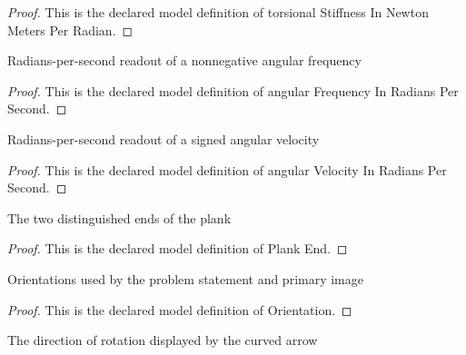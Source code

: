 \begin{proof}
  This is the declared model definition of torsional Stiffness In Newton Meters Per Radian.
\end{proof}
\begin{definition}
  \label{def:physics:phyx-mini-0232:phyxminiproblems-problemphyxmini0232-angularfrequencyinradianspersecond}
  Radians-per-second readout of a nonnegative angular frequency
\end{definition}
\begin{proof}
  This is the declared model definition of angular Frequency In Radians Per Second.
\end{proof}
\begin{definition}
  \label{def:physics:phyx-mini-0232:phyxminiproblems-problemphyxmini0232-angularvelocityinradianspersecond}
  Radians-per-second readout of a signed angular velocity
\end{definition}
\begin{proof}
  This is the declared model definition of angular Velocity In Radians Per Second.
\end{proof}
\begin{definition}
  \label{def:physics:phyx-mini-0232:phyxminiproblems-problemphyxmini0232-plankend}
  The two distinguished ends of the plank
\end{definition}
\begin{proof}
  This is the declared model definition of Plank End.
\end{proof}
\begin{definition}[Orientation]
  \label{def:physics:phyx-mini-0232:phyxminiproblems-problemphyxmini0232-orientation}
  Orientations used by the problem statement and primary image
\end{definition}
\begin{proof}
  This is the declared model definition of Orientation.
\end{proof}
\begin{definition}
  \label{def:physics:phyx-mini-0232:phyxminiproblems-problemphyxmini0232-rotationsense}
  The direction of rotation displayed by the curved arrow
\end{definition}
